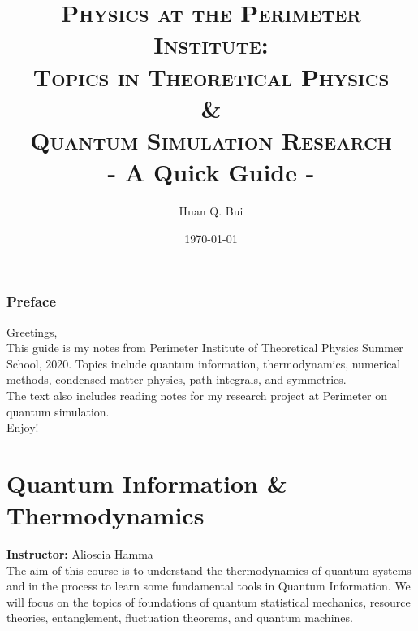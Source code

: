 \documentclass{book}
\theoremstyle{definition}
\begin{document}
\begin{titlepage}\centering
 \clearpage
 \title{{\textsc{\textbf{Physics at the Perimeter Institute:\\  Topics in Theoretical Physics \\ 
 				\&\\ Quantum Simulation Research}}}\\ \smallskip - A Quick Guide - \\}
 \author{\bigskip Huan Q. Bui}
 \date{\today}
 \maketitle
 \thispagestyle{empty}
\end{titlepage}

\subsection*{Preface}

Greetings,\\

This guide is my notes from Perimeter Institute of Theoretical Physics Summer School, 2020. Topics include quantum information, thermodynamics, numerical methods, condensed matter physics, path integrals, and symmetries.\\

The text also includes reading notes for my research project at Perimeter on quantum simulation. \\

Enjoy!  



\newpage
\tableofcontents
\newpage





\chapter{Quantum Information \& Thermodynamics} 

\textbf{Instructor:} Alioscia Hamma\\

The aim of this course is to understand the thermodynamics of quantum systems and in the process to learn some fundamental tools in Quantum Information. We will focus on the topics of foundations of quantum statistical mechanics, resource theories, entanglement, fluctuation theorems, and quantum machines. 
\end{document}
